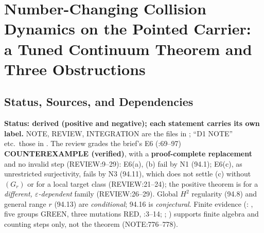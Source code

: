 
\section{Number-Changing Collision Dynamics on the Pointed Carrier: a Tuned Continuum Theorem and Three Obstructions}
\label{sec:number-changing-collision-dynamics}

\subsection{Status, Sources, and Dependencies}

\textbf{Status: derived (positive and negative); each statement carries its own label.}  NOTE, REVIEW, INTEGRATION are
the files in ; ``D1 NOTE'' etc.\ those in
.  The review grades the brief's E6 (:69--97)
\textbf{COUNTEREXAMPLE (verified)}, with a \textbf{proof-complete replacement} and no invalid step (REVIEW:9--29): E6(a), (b) fail by
N1 (94.1); E6(c), as unrestricted surjectivity, fails by N3 (94.11), which does not settle (c) without \((G_r)\) or for a
local target class (REVIEW:21--24); the positive theorem is for a \emph{different, \(\varepsilon\)-dependent} family (REVIEW:26--29).
Global \(H^2\) regularity (94.8) and general range \(r\) (94.13) are \emph{conditional}; 94.16 is \emph{conjectural}.  Finite
evidence (: , five groups GREEN, three mutations RED, :3--14; ;
) supports finite algebra and counting steps only, not the theorem (NOTE:776--778).

